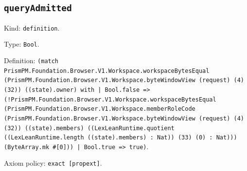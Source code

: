 \documentclass[11pt]{article}
\begin{document}
\subsection*{\texttt{queryAdmitted}}
\noindent Kind: \texttt{definition}.\par
\noindent Type: \texttt{Bool}.\par
\noindent Definition: \texttt{(match PrismPM.Foundation.Browser.V1.Workspace.workspaceBytesEqual (PrismPM.Foundation.Browser.V1.Workspace.byteWindowView (request) (4) (32)) ((state).owner) with | Bool.false => (!PrismPM.Foundation.Browser.V1.Workspace.workspaceBytesEqual (PrismPM.Foundation.Browser.V1.Workspace.memberRoleCode (PrismPM.Foundation.Browser.V1.Workspace.byteWindowView (request) (4) (32)) ((state).members) ((LexLeanRuntime.quotient ((LexLeanRuntime.length ((state).members) : Nat)) (33) (0) : Nat))) (ByteArray.mk \#[0])) | Bool.true => true)}.\par
\noindent Axiom policy: \texttt{exact [propext]}.\par
\end{document}
